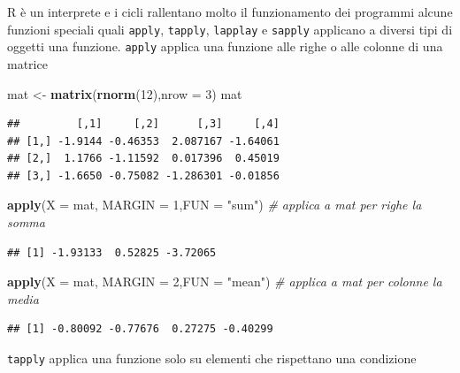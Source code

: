 \documentclass[
  11pt,
]{book}
\newenvironment{Shaded}{\begin{snugshade}}{\end{snugshade}}
\newcommand{\AttributeTok}[1]{\textcolor[rgb]{0.13,0.29,0.53}{#1}}
\newcommand{\CommentTok}[1]{\textcolor[rgb]{0.56,0.35,0.01}{\textit{#1}}}
\newcommand{\DecValTok}[1]{\textcolor[rgb]{0.00,0.00,0.81}{#1}}
\newcommand{\FunctionTok}[1]{\textcolor[rgb]{0.13,0.29,0.53}{\textbf{#1}}}
\newcommand{\NormalTok}[1]{#1}
\newcommand{\OtherTok}[1]{\textcolor[rgb]{0.56,0.35,0.01}{#1}}
\newcommand{\StringTok}[1]{\textcolor[rgb]{0.31,0.60,0.02}{#1}}
\theoremstyle{mytheoremstyle}
\theoremstyle{mydefstyle}
\begin{document}
R è un interprete e i cicli rallentano molto il funzionamento dei programmi
alcune funzioni speciali quali \texttt{apply}, \texttt{tapply}, \texttt{lapplay} e \texttt{sapply}
applicano a diversi tipi di oggetti una funzione.
\texttt{apply} applica una funzione alle righe o alle colonne di una matrice

\begin{Shaded}
\begin{Highlighting}[]
\NormalTok{mat }\OtherTok{\textless{}{-}} \FunctionTok{matrix}\NormalTok{(}\FunctionTok{rnorm}\NormalTok{(}\DecValTok{12}\NormalTok{),}\AttributeTok{nrow =} \DecValTok{3}\NormalTok{)}
\NormalTok{mat}
\end{Highlighting}
\end{Shaded}

\begin{verbatim}
##         [,1]     [,2]      [,3]     [,4]
## [1,] -1.9144 -0.46353  2.087167 -1.64061
## [2,]  1.1766 -1.11592  0.017396  0.45019
## [3,] -1.6650 -0.75082 -1.286301 -0.01856
\end{verbatim}

\begin{Shaded}
\begin{Highlighting}[]
\FunctionTok{apply}\NormalTok{(}\AttributeTok{X =}\NormalTok{ mat, }\AttributeTok{MARGIN =} \DecValTok{1}\NormalTok{,}\AttributeTok{FUN =} \StringTok{"sum"}\NormalTok{) }\CommentTok{\# applica a mat per righe la somma}
\end{Highlighting}
\end{Shaded}

\begin{verbatim}
## [1] -1.93133  0.52825 -3.72065
\end{verbatim}

\begin{Shaded}
\begin{Highlighting}[]
\FunctionTok{apply}\NormalTok{(}\AttributeTok{X =}\NormalTok{ mat, }\AttributeTok{MARGIN =} \DecValTok{2}\NormalTok{,}\AttributeTok{FUN =} \StringTok{"mean"}\NormalTok{) }\CommentTok{\# applica a mat per colonne la media}
\end{Highlighting}
\end{Shaded}

\begin{verbatim}
## [1] -0.80092 -0.77676  0.27275 -0.40299
\end{verbatim}

\texttt{tapply} applica una funzione solo su elementi che rispettano una condizione
\end{document}
